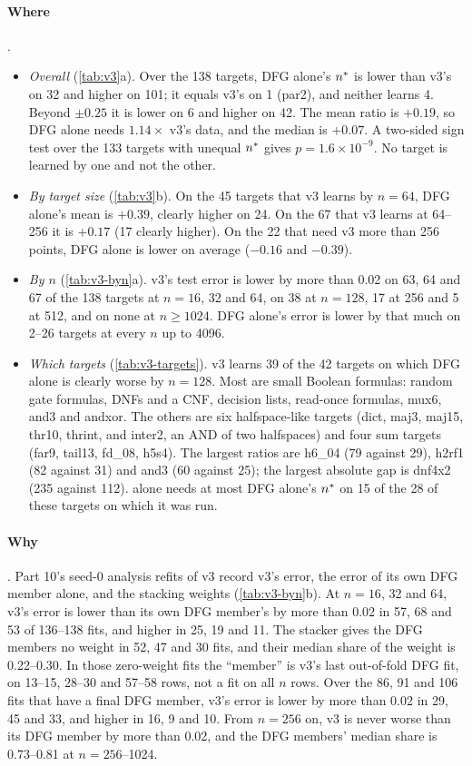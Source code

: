 \paragraph{Where} .
\begin{itemize}
\item \emph{Overall} (\cref{tab:v3}a). Over the 138 targets, DFG alone's $n^{*}$ is lower than v3's on 32 and higher on 101; it equals v3's on 1 (par2), and neither learns 4. Beyond $\pm0.25$ it is lower on 6 and higher on 42. The mean ratio is $+0.19$, so DFG alone needs $1.14\times$ v3's data, and the median is $+0.07$. A two-sided sign test over the 133 targets with unequal $n^{*}$ gives $p=1.6\times10^{-9}$. No target is learned by one and not the other.
\item \emph{By target size} (\cref{tab:v3}b). On the 45 targets that v3 learns by $n=64$, DFG alone's mean is $+0.39$, clearly higher on 24. On the 67 that v3 learns at 64--256 it is $+0.17$ (17 clearly higher). On the 22 that need v3 more than 256 points, DFG alone is lower on average ($-0.16$ and $-0.39$).
\item \emph{By $n$} (\cref{tab:v3-byn}a). v3's test error is lower by more than 0.02 on 63, 64 and 67 of the 138 targets at $n=16$, 32 and 64, on 38 at $n=128$, 17 at 256 and 5 at 512, and on none at $n\ge1024$. DFG alone's error is lower by that much on 2--26 targets at every $n$ up to 4096.
\item \emph{Which targets} (\cref{tab:v3-targets}). v3 learns 39 of the 42 targets on which DFG alone is clearly worse by $n=128$. Most are small Boolean formulas: random gate formulas, DNFs and a CNF, decision lists, read-once formulas, mux6, and3 and andxor. The others are six halfspace-like targets (dict, maj3, maj15, thr10, thrint, and inter2, an AND of two halfspaces) and four sum targets (far9, tail13, fd\_08, h5s4). The largest ratios are h6\_04 (79 against 29), h2rf1 (82 against 31) and and3 (60 against 25); the largest absolute gap is dnf4x2 (235 against 112).  alone needs at most DFG alone's $n^{*}$ on 15 of the 28 of these targets on which it was run.
\end{itemize}

\paragraph{Why} . Part 10's seed-0 analysis refits of v3 record v3's error, the error of its own DFG member alone, and the stacking weights (\cref{tab:v3-byn}b). At $n=16$, 32 and 64, v3's error is lower than its own DFG member's by more than 0.02 in 57, 68 and 53 of 136--138 fits, and higher in 25, 19 and 11. The stacker gives the DFG members no weight in 52, 47 and 30 fits, and their median share of the weight is 0.22--0.30. In those zero-weight fits the ``member'' is v3's last out-of-fold DFG fit, on 13--15, 28--30 and 57--58 rows, not a fit on all $n$ rows. Over the 86, 91 and 106 fits that have a final DFG member, v3's error is lower by more than 0.02 in 29, 45 and 33, and higher in 16, 9 and 10. From $n=256$ on, v3 is never worse than its DFG member by more than 0.02, and the DFG members' median share is 0.73--0.81 at $n=256$--1024.

